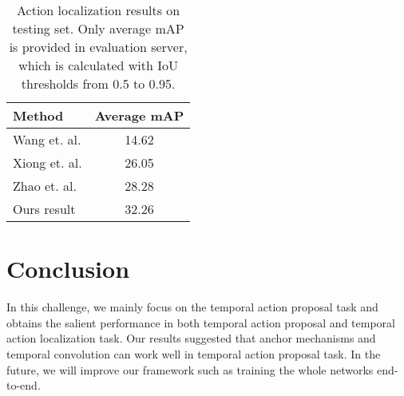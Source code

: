 \documentclass[10pt,twocolumn,letterpaper]{article}
\begin{document}
\begin{table}[tbp]

\centering
\caption{Action localization results on testing set. Only average mAP is provided in evaluation server, which is calculated with IoU thresholds from 0.5 to 0.95.}
\small
\begin{tabular}{p{5cm}<{\centering}c<{\centering}}
\toprule
Method  & Average mAP    \\
\midrule Wang et. al. \cite{wang2016uts}    & 14.62 \\
Xiong et. al. \cite{xiong2017pursuit}    & 26.05 \\
Zhao et. al. \cite{zhao2017temporal}   & 28.28 \\
\midrule Ours result  & 32.26  \\
\bottomrule
\end{tabular}
\label{result_detection_test}
\normalsize
\end{table}


\section{Conclusion}

In this challenge, we mainly focus on the temporal action proposal task and obtains the salient performance in both temporal action proposal and temporal action localization task. Our results suggested that anchor mechanisms and temporal convolution can work well in temporal action proposal task. In the future, we will improve our framework such as training the whole networks end-to-end.

{\small


}
\end{document}
